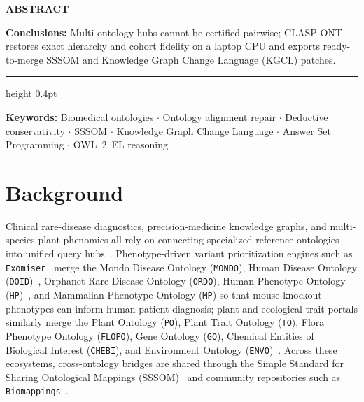 \documentclass[10pt]{article}
\theoremstyle{accentdef}
\renewenvironment{abstract}{%
  \vspace{4pt}%
  \begin{tcolorbox}[
    enhanced,
    breakable,
    colback=tintbg,
    colframe=hairline,
    boxrule=0.4pt,
    borderline west={2.6pt}{0pt}{accent},
    sharp corners,
    left=11pt,
    right=11pt,
    top=9pt,
    bottom=9pt
  ]%
  {\small\bfseries\color{accent}\lsstyle ABSTRACT}\par\vspace{4pt}%
  \small\linespread{1.05}\selectfont
}{%
  \end{tcolorbox}%
  \vspace{4pt}%
}
\begin{document}
\begin{abstract}
\vspace{3pt}
\textbf{\color{accent}Conclusions:} Multi-ontology hubs cannot be certified pairwise; \textsc{CLASP-ONT} restores exact hierarchy and cohort fidelity on a laptop CPU and exports ready-to-merge SSSOM and Knowledge Graph Change Language (KGCL) patches.

\vspace{4pt}
{\color{hairline}\hrule height 0.4pt}\vspace{4pt}
{\footnotesize\color{muted}\textbf{\color{accent}Keywords:} Biomedical ontologies $\cdot$ Ontology alignment repair $\cdot$ Deductive conservativity $\cdot$ SSSOM $\cdot$ Knowledge Graph Change Language $\cdot$ Answer Set Programming $\cdot$ OWL~2~EL reasoning}
\end{abstract}

\section*{Background}

Clinical rare-disease diagnostics, precision-medicine knowledge graphs, and multi-species plant phenomics all rely on connecting specialized reference ontologies into unified query hubs~\cite{smith2007obofoundry,ashburner2000go,chandak2023primekg}. Phenotype-driven variant prioritization engines such as \texttt{Exomiser}~\cite{smedley2015exomiser} merge the Mondo Disease Ontology (\texttt{MONDO}), Human Disease Ontology (\texttt{DOID})~\cite{schriml2012doid}, Orphanet Rare Disease Ontology (\texttt{ORDO}), Human Phenotype Ontology (\texttt{HP})~\cite{gargano2024hpo}, and Mammalian Phenotype Ontology (\texttt{MP}) so that mouse knockout phenotypes can inform human patient diagnosis; plant and ecological trait portals similarly merge the Plant Ontology (\texttt{PO}), Plant Trait Ontology (\texttt{TO}), Flora Phenotype Ontology (\texttt{FLOPO}), Gene Ontology (\texttt{GO}), Chemical Entities of Biological Interest (\texttt{CHEBI}), and Environment Ontology (\texttt{ENVO})~\cite{cooper2018planteome,buttigieg2013envo}. Across these ecosystems, cross-ontology bridges are shared through the Simple Standard for Sharing Ontological Mappings (SSSOM)~\cite{matentzoglu2022sssom} and community repositories such as \texttt{Biomappings}~\cite{hoyt2023biomappings}.
\end{document}
